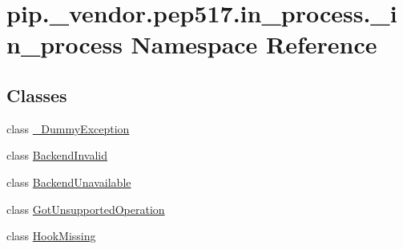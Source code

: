 \hypertarget{namespacepip_1_1__vendor_1_1pep517_1_1in__process_1_1__in__process}{}\section{pip.\+\_\+vendor.\+pep517.\+in\+\_\+process.\+\_\+in\+\_\+process Namespace Reference}
\label{namespacepip_1_1__vendor_1_1pep517_1_1in__process_1_1__in__process}
\subsection*{Classes}
\begin{DoxyCompactItemize}
\item 
class \hyperlink{classpip_1_1__vendor_1_1pep517_1_1in__process_1_1__in__process_1_1__DummyException}{\+\_\+\+Dummy\+Exception}
\item 
class \hyperlink{classpip_1_1__vendor_1_1pep517_1_1in__process_1_1__in__process_1_1BackendInvalid}{Backend\+Invalid}
\item 
class \hyperlink{classpip_1_1__vendor_1_1pep517_1_1in__process_1_1__in__process_1_1BackendUnavailable}{Backend\+Unavailable}
\item 
class \hyperlink{classpip_1_1__vendor_1_1pep517_1_1in__process_1_1__in__process_1_1GotUnsupportedOperation}{Got\+Unsupported\+Operation}
\item 
class \hyperlink{classpip_1_1__vendor_1_1pep517_1_1in__process_1_1__in__process_1_1HookMissing}{Hook\+Missing}
\end{DoxyCompactItemize}
